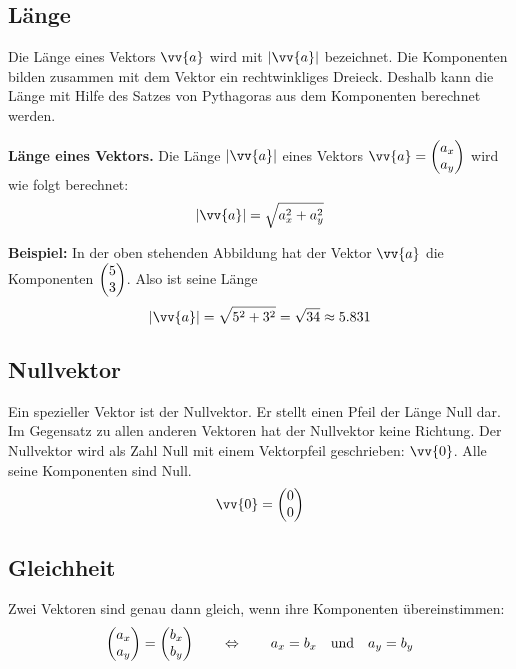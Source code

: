 \subsection{Länge}

Die Länge eines Vektors $\vv{a}$ wird mit $|\vv{a}|$ bezeichnet. Die Komponenten bilden zusammen mit dem Vektor ein rechtwinkliges Dreieck. Deshalb kann die Länge mit Hilfe des Satzes von Pythagoras aus dem Komponenten berechnet werden.

\begin{center}
\end{center}

\begin{theorem}
  \textbf{Länge eines Vektors.} Die Länge $|\vv{a}|$ eines Vektors $\vv{a} = \vxy{a_{x}}{a_{y}}$ wird wie folgt berechnet:
  \[
    |\vv{a}| = \sqrt{a_{x}^{2}+a_{y}^{2}}
  \]
\end{theorem}

\begin{example}
  \textbf{Beispiel:} In der oben stehenden Abbildung hat der Vektor $\vv{a}$ die Komponenten $\begin{pmatrix}5\\3\end{pmatrix}$. Also ist seine Länge
  \[
    |\vv{a}| = \sqrt{5^{2}+3^{2}} = \sqrt{34} \approx 5.831
  \]
\end{example}

\subsection{Nullvektor}

Ein spezieller Vektor ist der Nullvektor. Er stellt einen Pfeil der Länge Null dar. Im Gegensatz zu allen anderen Vektoren hat der Nullvektor keine Richtung. Der Nullvektor wird als Zahl Null mit einem Vektorpfeil geschrieben: $\vv{0}$. Alle seine Komponenten sind Null.
\[
  \vv{0} = \vxy{0}{0}
\]

\subsection{Gleichheit}

Zwei Vektoren sind genau dann gleich, wenn ihre Komponenten übereinstimmen:
\[
  \begin{pmatrix}a_{x}\\a_{y}\end{pmatrix} = \begin{pmatrix}b_{x}\\b_{y}\end{pmatrix} \qquad\Leftrightarrow\qquad a_{x} = b_{x} \quad\text{und}\quad a_{y} = b_{y}
\]